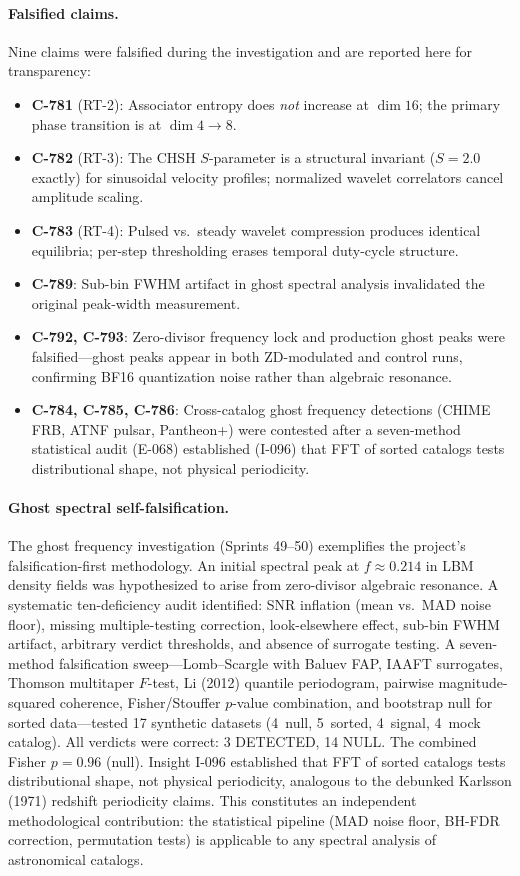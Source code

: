 \documentclass[12pt]{article}
\theoremstyle{definition}
\theoremstyle{plain}
\theoremstyle{remark}
\begin{document}
\paragraph{Falsified claims.}
Nine claims were falsified during the investigation and are reported
here for transparency:
\begin{itemize}
  \item \textbf{C-781} (RT-2): Associator entropy does \emph{not}
    increase at $\dim 16$; the primary phase transition is at
    $\dim 4 \to 8$.
  \item \textbf{C-782} (RT-3): The CHSH $S$-parameter is a structural
    invariant ($S = 2.0$ exactly) for sinusoidal velocity profiles;
    normalized wavelet correlators cancel amplitude scaling.
  \item \textbf{C-783} (RT-4): Pulsed vs.\ steady wavelet compression
    produces identical equilibria; per-step thresholding erases
    temporal duty-cycle structure.
  \item \textbf{C-789}: Sub-bin FWHM artifact in ghost spectral
    analysis invalidated the original peak-width measurement.
  \item \textbf{C-792, C-793}: Zero-divisor frequency lock and
    production ghost peaks were falsified---ghost peaks appear in
    both ZD-modulated and control runs, confirming BF16 quantization
    noise rather than algebraic resonance.
  \item \textbf{C-784, C-785, C-786}: Cross-catalog ghost frequency
    detections (CHIME FRB, ATNF pulsar, Pantheon+) were contested
    after a seven-method statistical audit (E-068) established
    (I-096) that FFT of sorted catalogs tests distributional shape,
    not physical periodicity.
\end{itemize}

\paragraph{Ghost spectral self-falsification.}
The ghost frequency investigation (Sprints 49--50) exemplifies the
project's falsification-first methodology.  An initial spectral peak at
$f \approx 0.214$ in LBM density fields was hypothesized to arise from
zero-divisor algebraic resonance.  A systematic ten-deficiency audit
identified: SNR inflation (mean vs.\ MAD noise floor), missing
multiple-testing correction, look-elsewhere effect, sub-bin FWHM
artifact, arbitrary verdict thresholds, and absence of surrogate
testing.  A seven-method falsification sweep---Lomb--Scargle with
Baluev FAP, IAAFT surrogates, Thomson multitaper $F$-test, Li (2012)
quantile periodogram, pairwise magnitude-squared coherence,
Fisher/Stouffer $p$-value combination, and bootstrap null for sorted
data---tested 17 synthetic datasets (4~null, 5~sorted, 4~signal,
4~mock catalog).  All verdicts were correct: 3 DETECTED, 14 NULL.  The
combined Fisher $p = 0.96$ (null).  Insight I-096 established that FFT
of sorted catalogs tests distributional shape, not physical periodicity,
analogous to the debunked Karlsson (1971) redshift periodicity claims.
This constitutes an independent methodological contribution: the
statistical pipeline (MAD noise floor, BH-FDR correction, permutation
tests) is applicable to any spectral analysis of astronomical catalogs.
\end{document}
